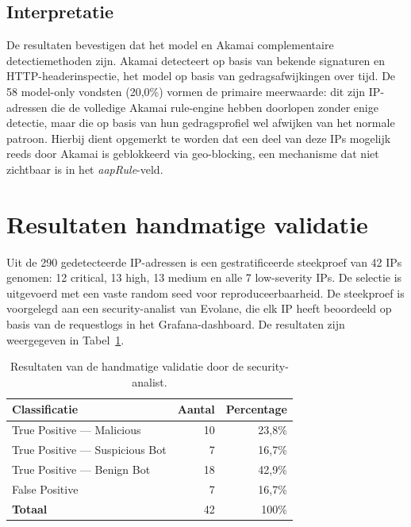 \subsection{Interpretatie}
 
De resultaten bevestigen dat het model en Akamai complementaire detectiemethoden zijn. Akamai detecteert op basis van bekende signaturen en HTTP-headerinspectie, het model op basis van gedragsafwijkingen over tijd. De 58 model-only vondsten (20,0\%) vormen de primaire meerwaarde: dit zijn IP-adressen die de volledige Akamai rule-engine hebben doorlopen zonder enige detectie, maar die op basis van hun gedragsprofiel wel afwijken van het normale patroon. Hierbij dient opgemerkt te worden dat een deel van deze IPs mogelijk reeds door Akamai is geblokkeerd via geo-blocking, een mechanisme dat niet zichtbaar is in het \textit{aapRule}-veld.
 
\section{Resultaten handmatige validatie}
\label{sec:resultaten-handmatige-validatie}
 
Uit de 290 gedetecteerde IP-adressen is een gestratificeerde steekproef van 42 IPs genomen: 12 critical, 13 high, 13 medium en alle 7 low-severity IPs. De selectie is uitgevoerd met een vaste random seed voor reproduceerbaarheid. De steekproef is voorgelegd aan een security-analist van Evolane, die elk IP heeft beoordeeld op basis van de requestlogs in het Grafana-dashboard. De resultaten zijn weergegeven in Tabel~\ref{tab:resultaten-validatie}.
 
\begin{table}[h]
\centering
\caption{Resultaten van de handmatige validatie door de security-analist.}
\label{tab:resultaten-validatie}
\begin{tabular}{l r r}
\hline
\textbf{Classificatie} & \textbf{Aantal} & \textbf{Percentage} \\
\hline
True Positive --- Malicious & 10 & 23,8\% \\
True Positive --- Suspicious Bot & 7 & 16,7\% \\
True Positive --- Benign Bot & 18 & 42,9\% \\
False Positive & 7 & 16,7\% \\
\hline
\textbf{Totaal} & 42 & 100\% \\
\hline
\end{tabular}
\end{table}
 
